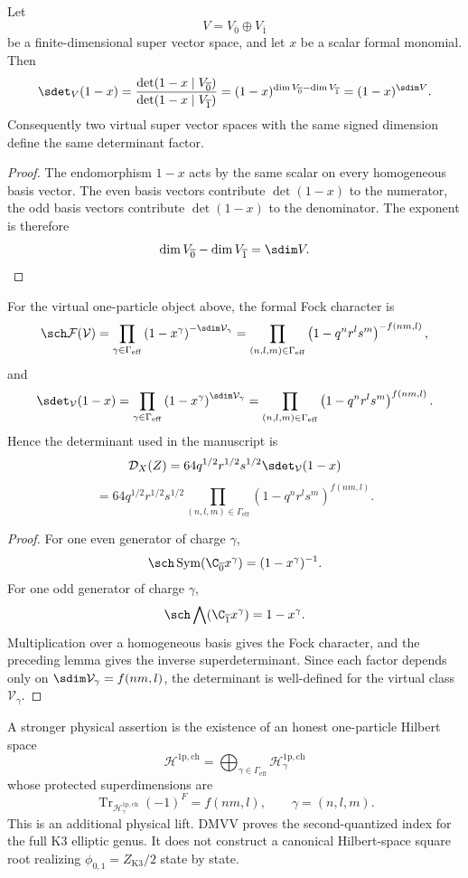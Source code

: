 \begin{lemma}
Let
$$V=V_{\overline0}\oplus V_{\overline1}$$
be a finite-dimensional super vector space, and let $x$ be a scalar
formal monomial.  Then
$$
\sdet_V(1-x)
=
\frac{\det(1-x\mid V_{\overline0})}
{\det(1-x\mid V_{\overline1})}
=
(1-x)^{\dim V_{\overline0}-\dim V_{\overline1}}
=(1-x)^{\sdim V}.
$$
Consequently two virtual super vector spaces with the same signed
dimension define the same determinant factor.
\end{lemma}

\begin{proof}
The endomorphism $1-x$ acts by the same scalar on every homogeneous
basis vector.  The even basis vectors contribute $\det(1-x)$ to the
numerator, the odd basis vectors contribute $\det(1-x)$ to the
denominator.  The exponent is therefore
$$\dim V_{\overline0}-\dim V_{\overline1}=\sdim V.$$
\end{proof}

\begin{theorem}
For the virtual one-particle object above, the formal Fock character is
$$
\sch\mathcal F(\mathcal V)
=
\prod_{\gamma\in\Gamma_{\mathrm{eff}}}
\left(1-x^\gamma\right)^{-\sdim\mathcal V_\gamma}
=
\prod_{(n,l,m)\in\Gamma_{\mathrm{eff}}}
\left(1-q^nr^ls^m\right)^{-f(nm,l)},
$$
and
$$
\sdet_{\mathcal V}(1-x)
=
\prod_{\gamma\in\Gamma_{\mathrm{eff}}}
\left(1-x^\gamma\right)^{\sdim\mathcal V_\gamma}
=
\prod_{(n,l,m)\in\Gamma_{\mathrm{eff}}}
\left(1-q^nr^ls^m\right)^{f(nm,l)}.
$$
Hence the determinant used in the manuscript is
$$
\mathcal D_X(Z)
=64q^{1/2}r^{1/2}s^{1/2}\sdet_{\mathcal V}(1-x)
$$
$$
=64q^{1/2}r^{1/2}s^{1/2}
\prod_{(n,l,m)\in\Gamma_{\mathrm{eff}}}
\left(1-q^nr^ls^m\right)^{f(nm,l)}.
$$
\end{theorem}

\begin{proof}
For one even generator of charge $\gamma$,
$$\sch\operatorname{Sym}(\C_{\overline0}x^\gamma)
=(1-x^\gamma)^{-1}.$$
For one odd generator of charge $\gamma$,
$$\sch\bigwedge(\C_{\overline1}x^\gamma)=1-x^\gamma.$$
Multiplication over a homogeneous basis gives the Fock character, and
the preceding lemma gives the inverse superdeterminant.  Since each
factor depends only on $\sdim\mathcal V_\gamma=f(nm,l)$, the determinant
is well-defined for the virtual class $\mathcal V_\gamma$.
\end{proof}

\begin{assumption}
A stronger physical assertion is the existence of an honest
one-particle Hilbert space
$$
\mathcal H^{\mathrm{1p,ch}}=
\bigoplus_{\gamma\in\Gamma_{\mathrm{eff}}}
\mathcal H^{\mathrm{1p,ch}}_\gamma
$$
whose protected superdimensions are
$$
\operatorname{Tr}_{\mathcal H^{\mathrm{1p,ch}}_\gamma}(-1)^F
=f(nm,l),\qquad \gamma=(n,l,m).
$$
This is an additional physical lift.  DMVV proves the
second-quantized index for the full K3 elliptic genus.  It does not
construct a canonical Hilbert-space square root realizing
$\phi_{0,1}=Z_{\mathrm{K3}}/2$ state by state.
\end{assumption}

